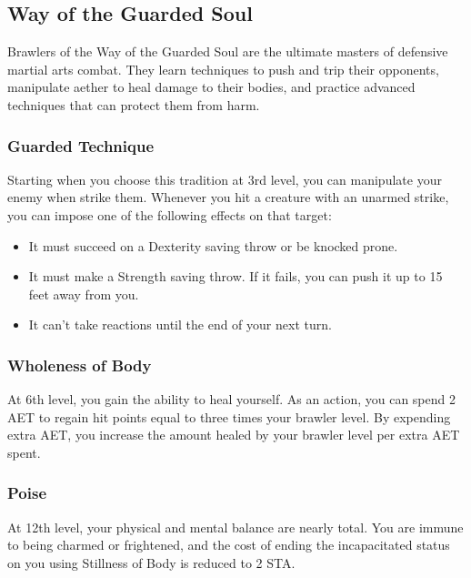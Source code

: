 \subsection{Way of the Guarded Soul}

Brawlers of the Way of the Guarded Soul are the ultimate masters of defensive martial arts combat. They learn techniques to push and trip their opponents, manipulate aether to heal damage to their bodies, and practice advanced techniques that can protect them from harm.

\subsubsection{Guarded Technique}

Starting when you choose this tradition at 3rd level, you can manipulate your enemy when strike them. Whenever you hit a creature with an unarmed strike, you can impose one of the following effects on that target:
\begin{itemize}
\item It must succeed on a Dexterity saving throw or be knocked prone.
\item It must make a Strength saving throw. If it fails, you can push it up to 15 feet away from you.
\item It can't take reactions until the end of your next turn.
\end{itemize}

\subsubsection{Wholeness of Body}

At 6th level, you gain the ability to heal yourself. As an action, you can spend 2 AET to regain hit points equal to three times your brawler level. By expending extra AET, you increase the amount healed by your brawler level per extra AET spent.

\subsubsection{Poise}
At 12th level, your physical and mental balance are nearly total. You are immune to being charmed or frightened, and the cost of ending the incapacitated status on you using Stillness of Body is reduced to 2 STA.

